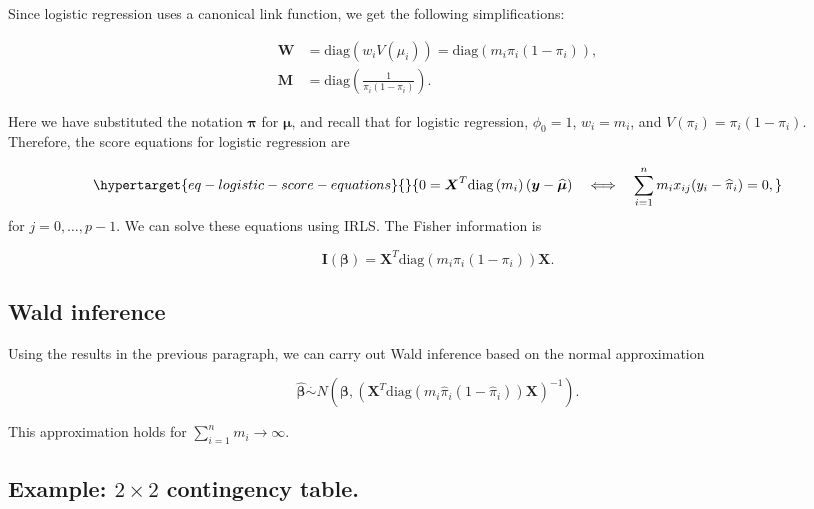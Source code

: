 \documentclass[
  11pt,
  letterpaper,
  oneside]{book}
\theoremstyle{plain}
\theoremstyle{definition}
\theoremstyle{definition}
\theoremstyle{plain}
\theoremstyle{plain}
\theoremstyle{remark}
\begin{document}
Since logistic regression uses a canonical link function, we get the
following simplifications:

\[
\begin{aligned}
\boldsymbol{W} &= \text{diag}\left(w_i V(\mu_i)\right) = \text{diag}\left(m_i \pi_i(1-\pi_i)\right), \\
\boldsymbol{M} &= \text{diag}\left(\frac{1}{\pi_i(1-\pi_i)}\right).
\end{aligned}
\]

Here we have substituted the notation \(\boldsymbol{\pi}\) for
\(\boldsymbol{\mu}\), and recall that for logistic regression,
\(\phi_0 = 1\), \(w_i = m_i\), and \(V(\pi_i) = \pi_i(1-\pi_i)\).
Therefore, the score equations for logistic regression are

\begin{equation}\protect\hypertarget{eq-logistic-score-equations}{}{
0 = \boldsymbol{X}^T \text{diag}\left(m_i\right)(\boldsymbol{y} - \boldsymbol{\widehat{\mu}}) \quad \Longleftrightarrow \quad \sum_{i = 1}^n m_i x_{ij}(y_i-\widehat{\pi}_i) = 0,
}\label{eq-logistic-score-equations}\end{equation} for
\(j = 0, \dots, p-1\). We can solve these equations using IRLS. The
Fisher information is

\[
\boldsymbol{I}(\boldsymbol{\beta}) = \boldsymbol{X}^T \text{diag}\left(m_i \pi_i(1-\pi_i)\right) \boldsymbol{X}.
\]

\hypertarget{sec-wald-inference}{%
\subsection{Wald inference}\label{sec-wald-inference}}

Using the results in the previous paragraph, we can carry out Wald
inference based on the normal approximation

\[
\boldsymbol{\widehat \beta} \overset \cdot \sim N\left(\boldsymbol \beta, \left(\boldsymbol X^T\text{diag}(m_i \widehat \pi_i(1-\widehat \pi_i))\boldsymbol X\right)^{-1}\right).
\]

This approximation holds for \(\sum_{i = 1}^n m_i \rightarrow \infty\).

\hypertarget{sec-2x2-contingency-table}{%
\subsection{\texorpdfstring{Example: \(2 \times 2\) contingency
table.}{Example: 2 \textbackslash times 2 contingency table.}}\label{sec-2x2-contingency-table}}
\end{document}

